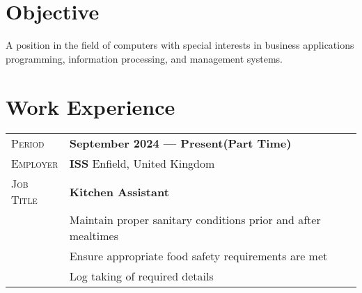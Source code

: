 \documentclass[a4paper, oneside, final]{scrartcl} %
\newcommand{\gray}{\rowcolor[gray]{.90}} %
\begin{document}
\begin{center} %


{\fontsize{36}{36}\selectfont\scshape{}} %

\vspace{1.5cm} %


\section{Objective}

A position in the field of computers with special interests in business applications \\ programming, information processing, and management systems.


\section{Work Experience}

\begin{tabularx}{0.97\linewidth}{>{\raggedleft\scshape}p{2cm}X}
\gray Period & \textbf{September 2024 --- Present(Part Time)}\\
\gray Employer & \textbf{ISS} \hfill Enfield, United Kingdom\\
\gray Job Title & \textbf{Kitchen Assistant}\\
       & Maintain proper sanitary conditions prior and after mealtimes\\
       & Ensure appropriate food safety requirements are met\\
       & Log taking of required details\\
\end{tabularx}


\end{center}
\end{document}
